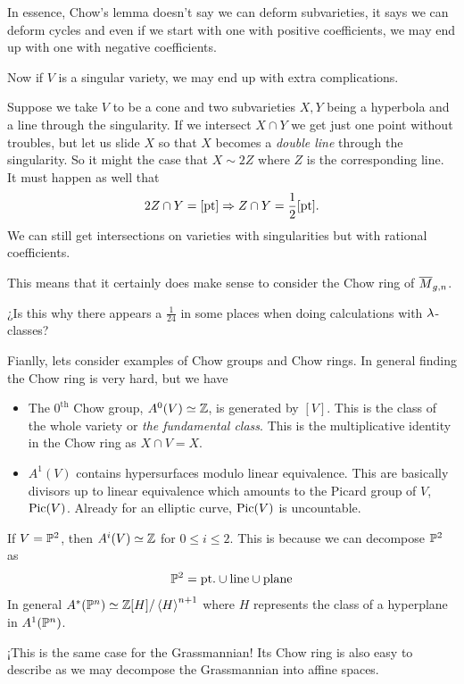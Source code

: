 \documentclass[12pt]{memoir}
\begin{document}
In essence, Chow's lemma doesn't say we can deform subvarieties, it says we can deform cycles and even if we start with one with positive coefficients, we may end up with one with negative coefficients.\par 

Now if $V$ is a singular variety, we may end up with extra complications.

\begin{Ex}
    Suppose we take $V$ to be a cone and two subvarieties $X,Y$ being a hyperbola and a line through the singularity.
    If we intersect $X\cap Y$ we get just one point without troubles, but let us slide $X$ so that $X$ becomes a \emph{double line} through the singularity. So it might the case that $X\sim 2Z$ where $Z$ is the corresponding line. It must happen as well that 
    $$2Z\cap Y=[\text{pt}]\To Z\cap Y =\half[\text{pt}].$$
    We can still get intersections on varieties with singularities but with rational coefficients.
\end{Ex}

This means that it certainly does make sense to consider the Chow ring of $\overline{M}_{g,n}$.

\begin{Qn}
¿Is this why there appears a $\frac{1}{24}$ in some places when doing calculations with $\lambda$-classes?
\end{Qn}

Fianlly, lets consider examples of Chow groups and Chow rings. In general finding the Chow ring is very hard, but we have
\begin{itemize}
    \item The $0^{\text{th}}$ Chow group, $A^0(V)\simeq\mathbb{Z}$, is generated by $[V]$. This is the class of the whole variety or \emph{the fundamental class}. This is the multiplicative identity in the Chow ring as $X\cap V=X$. 
    \item $A^1(V)$ contains hypersurfaces modulo linear equivalence. This are basically divisors up to linear equivalence which amounts to the Picard group of $V$, $\operatorname{Pic}(V)$. Already for an elliptic curve, $\operatorname{Pic}(V)$ is uncountable.
\end{itemize}

\begin{Ex}
    If $V=\mathbb{P}^2$, then $A^{i}(V)\simeq\mathbb{Z}$ for $0\leq i\leq 2$. This is because we can decompose $\mathbb{P}^2$ as 
    $$\mathbb{P}^2=\text{pt.}\cup\text{line}\cup\text{plane}$$
    In general $A^\ast(\mathbb{P}^n)\simeq\mathbb{Z}[H]/\left\langle H\right\rangle^{n+1}$ where $H$ represents the class of a hyperplane in $A^1(\mathbb{P}^n)$.\par
    ¡This is the same case for the Grassmannian! Its Chow ring is also easy to describe as we may decompose the Grassmannian into affine spaces.
\end{Ex}
\end{document}
